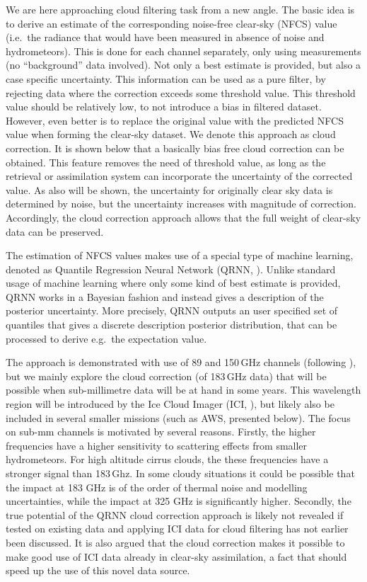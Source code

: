 \documentclass[amt, manuscript]{copernicus}
\begin{document}
We are here approaching cloud filtering task from a new angle. The basic idea
is to derive an estimate of the corresponding noise-free clear-sky (NFCS) value
(i.e.\ the radiance that would have been measured in absence of noise and
hydrometeors). This is done for each channel separately, only using
measurements (no ``background'' data involved). Not only a best estimate is
provided, but also a case specific uncertainty. This information can be used as a pure filter, by rejecting data where the correction exceeds some threshold value. This threshold value should be
relatively low, to not introduce a bias in filtered dataset. However, even
better is to replace the original value with the predicted NFCS value when
forming the clear-sky dataset. We denote this approach as cloud correction. It
is shown below that a basically bias free cloud correction can be obtained.
This feature removes the need of threshold value, as long as the retrieval or
assimilation system can incorporate the uncertainty of the corrected value. As
also will be shown, the uncertainty for originally clear sky data is determined
by noise, but the uncertainty increases with magnitude of correction.
Accordingly, the cloud correction approach allows that the full weight of
clear-sky data can be preserved.

The estimation of NFCS values makes use of a special type of machine learning,
denoted as Quantile Regression Neural Network (QRNN,
\citet{pfreundschuh:aneur:18}). Unlike standard usage of machine learning where
only some kind of best estimate is provided, QRNN works in a Bayesian fashion
and instead gives a description of the posterior uncertainty. More precisely,
QRNN outputs an user specified set of quantiles that gives a discrete
description posterior distribution, that can be processed to derive e.g.\ the
expectation value.

The approach is demonstrated with use of 89 and 150\,GHz channels (following
\citet{geer2015scatteringindex}), but we mainly explore the cloud correction (of
183\,GHz data) that will be possible when sub-millimetre data will be at hand
in some years. This wavelength region will be introduced by the Ice Cloud
Imager (ICI, \citet{eriksson:towar:20}), but likely also be included in several
smaller missions (such as AWS, presented below). The focus on sub-mm channels is motivated by several reasons.  Firstly, the higher frequencies have a higher sensitivity to scattering effects from smaller hydrometeors. For high altitude cirrus clouds, the these frequencies have a stronger signal than 183\,Ghz. In some cloudy situations it could be possible that the impact at 183 GHz is of the order of thermal noise and modelling uncertainties, while the impact at 325 GHz is significantly higher. Secondly, the true potential of the QRNN cloud correction approach is likely not revealed if tested on existing
data and applying ICI data for cloud filtering has not earlier been discussed. It is also argued that the cloud correction makes it possible to make good use of ICI data already in clear-sky assimilation, a fact that should speed up the use of this novel data source.
\end{document}
